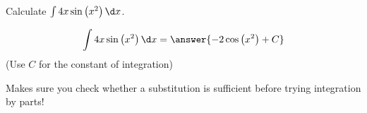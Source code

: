 \documentclass{ximera}
\author{Jim Talamo}
\begin{document}
\begin{exercise}
Calculate $\int 4x \sin\left(x^2\right) \d x $.


\[
 \int 4x \sin\left(x^2\right) \d x = \answer{ -2\cos\left(x^2\right)  + C } 
\]
(Use $C$ for the constant of integration)

\begin{feedback}
Makes sure you check whether a substitution is sufficient before trying integration by parts!
\end{feedback}
\end{exercise}
\end{document}
